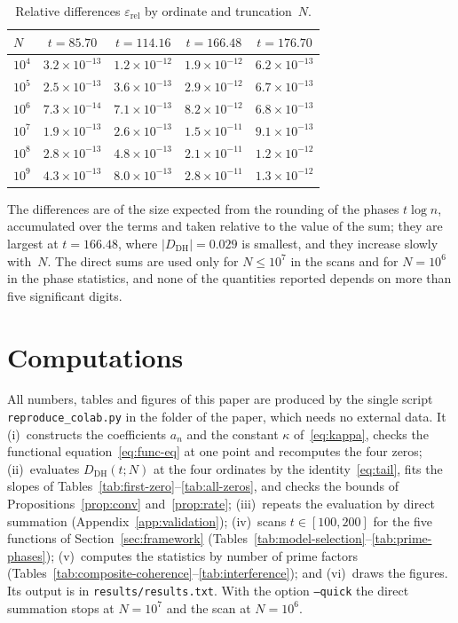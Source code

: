 \documentclass[11pt]{amsart}
\theoremstyle{definition}
\theoremstyle{remark}
\renewcommand{\DH}{\mathrm{DH}}
\newcommand{\abs}[1]{\lvert #1 \rvert}
\begin{document}
\begin{table}[ht]
\centering
\caption{Relative differences $\varepsilon_{\mathrm{rel}}$ by ordinate and
  truncation~$N$.}
\label{tab:validation-detail}
\begin{tabular}{@{}lcccc@{}}
\toprule
$N$ & $t=85.70$ & $t=114.16$ & $t=166.48$ & $t=176.70$ \\
\midrule
$10^{4}$ & $3.2\times10^{-13}$ & $1.2\times10^{-12}$ & $1.9\times10^{-12}$ & $6.2\times10^{-13}$ \\
$10^{5}$ & $2.5\times10^{-13}$ & $3.6\times10^{-13}$ & $2.9\times10^{-12}$ & $6.7\times10^{-13}$ \\
$10^{6}$ & $7.3\times10^{-14}$ & $7.1\times10^{-13}$ & $8.2\times10^{-12}$ & $6.8\times10^{-13}$ \\
$10^{7}$ & $1.9\times10^{-13}$ & $2.6\times10^{-13}$ & $1.5\times10^{-11}$ & $9.1\times10^{-13}$ \\
$10^{8}$ & $2.8\times10^{-13}$ & $4.8\times10^{-13}$ & $2.1\times10^{-11}$ & $1.2\times10^{-12}$ \\
$10^{9}$ & $4.3\times10^{-13}$ & $8.0\times10^{-13}$ & $2.8\times10^{-11}$ & $1.3\times10^{-12}$ \\
\bottomrule
\end{tabular}
\end{table}

The differences are of the size expected from the rounding of the phases
$t\log n$, accumulated over the terms and taken relative to the value of
the sum; they are largest at $t=166.48$, where $\abs{D_{\DH}}=0.029$ is
smallest, and they increase slowly with~$N$.  The direct sums are used
only for $N\le10^7$ in the scans and for $N=10^6$ in the phase statistics,
and none of the quantities reported depends on more than five significant
digits.

\section{Computations}\label{app:notebooks}

All numbers, tables and figures of this paper are produced by the single
script \texttt{reproduce\_colab.py} in the folder of the paper, which needs
no external data.  It (i)~constructs the coefficients $a_n$ and the
constant $\kappa$ of~\eqref{eq:kappa}, checks the functional
equation~\eqref{eq:func-eq} at one point and recomputes the four zeros;
(ii)~evaluates $D_{\DH}(t;N)$ at the four ordinates by the
identity~\eqref{eq:tail}, fits the slopes of
Tables~\ref{tab:first-zero}--\ref{tab:all-zeros}, and checks the bounds of
Propositions~\ref{prop:conv} and~\ref{prop:rate};
(iii)~repeats the evaluation by direct summation
(Appendix~\ref{app:validation});
(iv)~scans $t\in[100,200]$ for the five functions of
Section~\ref{sec:framework}
(Tables~\ref{tab:model-selection}--\ref{tab:prime-phases});
(v)~computes the statistics by number of prime factors
(Tables~\ref{tab:composite-coherence}--\ref{tab:interference}); and
(vi)~draws the figures.  Its output is in \texttt{results/results.txt}.
With the option \texttt{--quick} the direct summation stops at $N=10^7$
and the scan at $N=10^6$.
\end{document}
